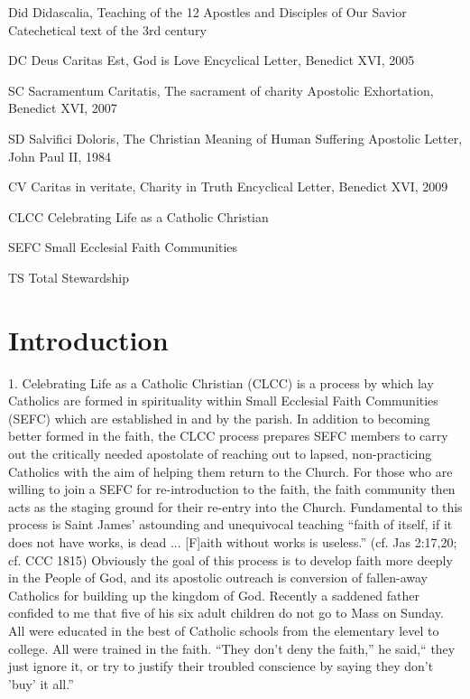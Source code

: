 \documentclass[oneside]{book}
\begin{document}
Did    Didascalia, Teaching of the 12 Apostles and Disciples of
      Our Savior
    Catechetical text of the 3rd century

DC    Deus Caritas Est, God is Love
    Encyclical Letter, Benedict XVI, 2005

SC    Sacramentum Caritatis, The sacrament of charity
    Apostolic Exhortation, Benedict XVI, 2007

SD    Salvifici Doloris, The Christian Meaning of Human Suffering
    Apostolic Letter, John Paul II, 1984

CV    Caritas in veritate, Charity in Truth
    Encyclical Letter, Benedict XVI, 2009

CLCC        Celebrating Life as a Catholic Christian

SEFC        Small Ecclesial Faith Communities

TS        Total Stewardship


\chapter{Introduction}

1. Celebrating Life as a Catholic Christian (CLCC) is a process by which lay
Catholics are formed in spirituality within Small Ecclesial Faith Communities
(SEFC) which are established in and by the parish. In addition to becoming
better formed in the faith, the CLCC process prepares SEFC members to carry out
the critically needed apostolate of reaching out to lapsed, non-practicing
Catholics with the aim of helping them return to the Church. For those who are
willing to join a SEFC for re-introduction to the faith, the faith community
then acts as the staging ground for their re-entry into the Church. Fundamental
to this process is Saint James' astounding and unequivocal teaching ``faith of
itself, if it does not have works, is dead ... [F]aith without works is
useless.'' (cf. Jas 2:17,20; cf. CCC 1815) Obviously the goal of this process is
to develop faith more deeply in the People of God, and its apostolic outreach is
conversion of fallen-away Catholics for building up the kingdom of God.
Recently a saddened father confided to me that five of his six adult children do
not go to Mass on Sunday. All were educated in the best of Catholic schools from
the elementary level to college. All were trained in the faith. ``They don't
deny the faith,'' he said,`` they just ignore it, or try to justify their
troubled conscience by saying they don't 'buy' it all.''
\end{document}

